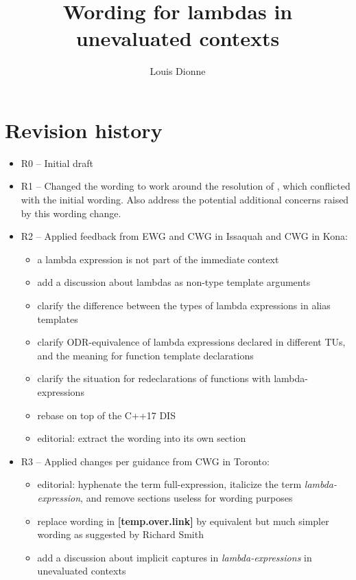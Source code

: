 \documentclass{wg21}
\title{Wording for lambdas in unevaluated contexts}
\author{Louis Dionne}{ldionne.2@gmail.com}
\begin{document}
\maketitle
\tableofcontents

\section{Revision history}
\begin{itemize}
  \item R0 -- Initial draft
  \item R1 -- Changed the wording to work around the resolution of \cite{DR1607},
              which conflicted with the initial wording. Also address the
              potential additional concerns raised by this wording change.
  \item R2 -- Applied feedback from EWG and CWG in Issaquah and CWG in Kona:
              \begin{itemize}
                \item a lambda expression is not part of the immediate context
                \item add a discussion about lambdas as non-type template arguments
                \item clarify the difference between the types of lambda expressions
                      in alias templates
                \item clarify ODR-equivalence of lambda expressions declared in
                      different TUs, and the meaning for function template
                      declarations
                \item clarify the situation for redeclarations of functions with
                      lambda-expressions
                \item rebase on top of the C++17 DIS
                \item editorial: extract the wording into its own section
              \end{itemize}
  \item R3 -- Applied changes per guidance from CWG in Toronto:
    \begin{itemize}
      \item editorial: hyphenate the term full-expression, italicize the
            term \textit{lambda-expression}, and remove sections useless
            for wording purposes
      \item replace wording in \textbf{[temp.over.link]} by equivalent but
            much simpler wording as suggested by Richard Smith
      \item add a discussion about implicit captures in \textit{lambda-expressions}
            in unevaluated contexts
    \end{itemize}
\end{itemize}
\end{document}
